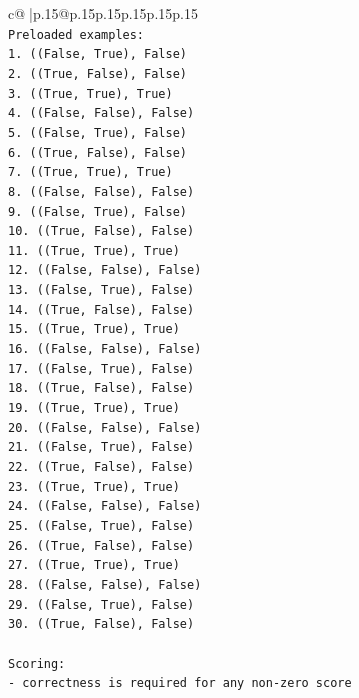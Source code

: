 \documentclass{article}
\begin{document}
{\begin{supertabular}{c@{$\;$}|p{.15\linewidth}@{}p{.15\linewidth}p{.15\linewidth}p{.15\linewidth}p{.15\linewidth}p{.15\linewidth}}
{{{\\ 
\texttt{Preloaded examples:} \\
\texttt{1. ((False, True), False)} \\
\texttt{2. ((True, False), False)} \\
\texttt{3. ((True, True), True)} \\
\texttt{4. ((False, False), False)} \\
\texttt{5. ((False, True), False)} \\
\texttt{6. ((True, False), False)} \\
\texttt{7. ((True, True), True)} \\
\texttt{8. ((False, False), False)} \\
\texttt{9. ((False, True), False)} \\
\texttt{10. ((True, False), False)} \\
\texttt{11. ((True, True), True)} \\
\texttt{12. ((False, False), False)} \\
\texttt{13. ((False, True), False)} \\
\texttt{14. ((True, False), False)} \\
\texttt{15. ((True, True), True)} \\
\texttt{16. ((False, False), False)} \\
\texttt{17. ((False, True), False)} \\
\texttt{18. ((True, False), False)} \\
\texttt{19. ((True, True), True)} \\
\texttt{20. ((False, False), False)} \\
\texttt{21. ((False, True), False)} \\
\texttt{22. ((True, False), False)} \\
\texttt{23. ((True, True), True)} \\
\texttt{24. ((False, False), False)} \\
\texttt{25. ((False, True), False)} \\
\texttt{26. ((True, False), False)} \\
\texttt{27. ((True, True), True)} \\
\texttt{28. ((False, False), False)} \\
\texttt{29. ((False, True), False)} \\
\texttt{30. ((True, False), False)} \\
\\ 
\texttt{Scoring:} \\
\texttt{{-} correctness is required for any non{-}zero score} \\
}}}
\end{supertabular}}
\end{document}
